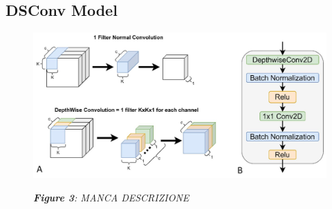 \documentclass[conference]{IEEEtran}
\begin{document}
\subsection{DSConv Model}
\begin{figure}[t]
\centering
\includegraphics[scale=0.46]{confronto2}

\begin{small}\textit{\textbf{Figure 3}: MANCA DESCRIZIONE}
\end{small}
\end{figure}
\end{document}
